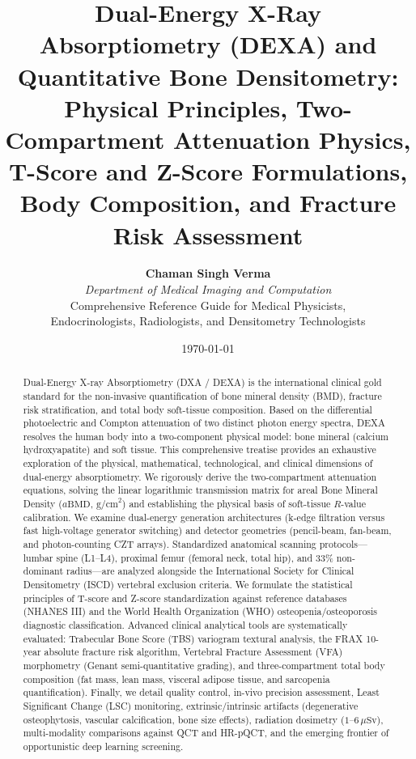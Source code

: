 \documentclass[11pt,a4paper]{article}
\title{\textbf{\huge Dual-Energy X-Ray Absorptiometry (DEXA) and Quantitative Bone Densitometry:}\\[0.4em]
\Large Physical Principles, Two-Compartment Attenuation Physics, T-Score and Z-Score Formulations, Body Composition, and Fracture Risk Assessment}
\author{\textbf{Chaman Singh Verma} \\
\textit{Department of Medical Imaging and Computation} \\
\small \textsf{Comprehensive Reference Guide for Medical Physicists,}\\[0.2em]
\small \textsf{Endocrinologists, Radiologists, and Densitometry Technologists}}
\date{\today}
\begin{document}
\maketitle

\begin{abstract}
Dual-Energy X-ray Absorptiometry (DXA / DEXA) is the international clinical gold standard for the non-invasive quantification of bone mineral density (BMD), fracture risk stratification, and total body soft-tissue composition. Based on the differential photoelectric and Compton attenuation of two distinct photon energy spectra, DEXA resolves the human body into a two-component physical model: bone mineral (calcium hydroxyapatite) and soft tissue. This comprehensive treatise provides an exhaustive exploration of the physical, mathematical, technological, and clinical dimensions of dual-energy absorptiometry. We rigorously derive the two-compartment attenuation equations, solving the linear logarithmic transmission matrix for areal Bone Mineral Density ($a\text{BMD}$, $\text{g/cm}^2$) and establishing the physical basis of soft-tissue $R$-value calibration. We examine dual-energy generation architectures (k-edge filtration versus fast high-voltage generator switching) and detector geometries (pencil-beam, fan-beam, and photon-counting CZT arrays). Standardized anatomical scanning protocols—lumbar spine (L1--L4), proximal femur (femoral neck, total hip), and 33\% non-dominant radius—are analyzed alongside the International Society for Clinical Densitometry (ISCD) vertebral exclusion criteria. We formulate the statistical principles of T-score and Z-score standardization against reference databases (NHANES III) and the World Health Organization (WHO) osteopenia/osteoporosis diagnostic classification. Advanced clinical analytical tools are systematically evaluated: Trabecular Bone Score (TBS) variogram textural analysis, the FRAX 10-year absolute fracture risk algorithm, Vertebral Fracture Assessment (VFA) morphometry (Genant semi-quantitative grading), and three-compartment total body composition (fat mass, lean mass, visceral adipose tissue, and sarcopenia quantification). Finally, we detail quality control, in-vivo precision assessment, Least Significant Change (LSC) monitoring, extrinsic/intrinsic artifacts (degenerative osteophytosis, vascular calcification, bone size effects), radiation dosimetry ($1\text{--}6\,\mu\text{Sv}$), multi-modality comparisons against QCT and HR-pQCT, and the emerging frontier of opportunistic deep learning screening.
\end{abstract}
\end{document}
